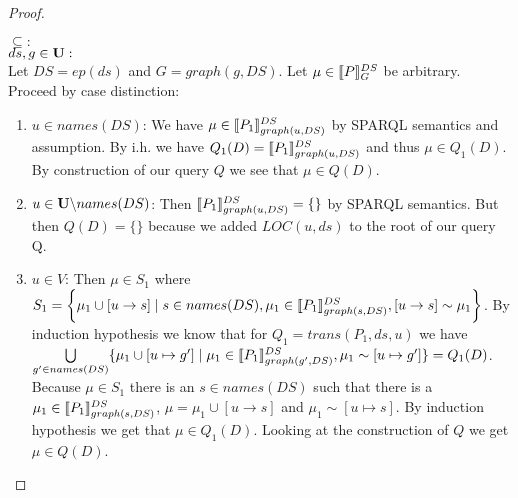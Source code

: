 \begin{proof}
\begin{enumerate}
		$\subseteq:$\\
		$ds,g \in \mathbf{U}:$ \\
		Let $DS = ep(ds)$ and $G = graph(g,DS)$.
		Let $\mu \in \llbracket P \rrbracket^{DS}_{G}$ be arbitrary.
		Proceed by case distinction:
		\begin{enumerate}
			\item $u \in names(DS)$: We have $\mu \in \llbracket P_1
				\rrbracket^{DS}_{graph(u,DS)}$ by SPARQL semantics and assumption. By i.h. we have 
				$Q_1(D) =  \llbracket P_1\rrbracket^{DS}_{graph(u,DS)}$ and thus $\mu \in
				Q_1(D)$. By
				construction of our query $Q$ we see that $\mu \in Q(D)$.

			\item $u \in \mathbf{U} \backslash names(DS)$:
				Then $\llbracket P_1 \rrbracket^{DS}_{graph(u,DS)} = \{\}$ by SPARQL semantics. But then
				$Q(D) = \{\}$ because we added $LOC(u,ds)$ to the root of our
				query Q.
			\item $u \in V$:
				Then $\mu \in S_1$ where $S_1 =  \bigg\{\mu_1 \cup [ u \rightarrow s ] \mid
					s \in names(DS), \mu_1 \in \llbracket P_1
					\rrbracket^{DS}_{graph(s,DS)}, [ u \rightarrow s ] \sim
				\mu_1 \bigg\}$. 
				By induction hypothesis we know that for $Q_1
				= trans(P_1,ds,u)$ we have
				$\bigcup\limits_{g'\in names(DS)} \{ \mu_1 \cup [u\mapsto g'] \mid
					\mu_1 \in \llbracket P_1 \rrbracket^{DS}_{graph(g',DS)}, \mu_1 \sim [u
				\mapsto g']\} = Q_1(D)$. Because $\mu \in S_1$ there
				is an $s \in names(DS)$ such  that there is a $\mu_1 \in \llbracket P_1
				\rrbracket^{DS}_{graph(s,DS)}$, $\mu = \mu_1 \cup [u \rightarrow
				s]$ and  $\mu_1 \sim [u \mapsto s]$. By 
				induction hypothesis we get that $\mu \in Q_1(D)$.
				Looking at the construction of $Q$ we get $\mu \in Q(D)$.
		\end{enumerate}


\end{enumerate}
\end{proof}
